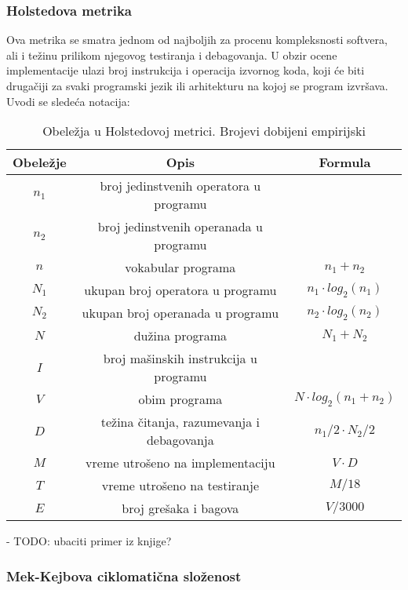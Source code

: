 \documentclass[a4paper]{article}
\begin{document}
\subsubsection{Holstedova metrika}
\label{subsec:holsted}

Ova metrika se smatra jednom od najboljih za procenu kompleksnosti softvera, ali i težinu prilikom njegovog testiranja i debagovanja. U obzir ocene implementacije ulazi broj instrukcija i operacija izvornog koda, koji će biti drugačiji za svaki programski jezik ili arhitekturu na kojoj se program izvršava. Uvodi se sledeća notacija:\\
\begin{center}
 \begin{table}[h]
 \begin{tabular}{|c|c|c|}
 \hline
 Obeležje & Opis & Formula \\ [0ex] 
 \hline
 $n_1$ & broj jedinstvenih operatora u programu & \\ 
 \hline
 $n_2$ & broj jedinstvenih operanada u programu & \\ 
 \hline
 $n$ & vokabular programa & $ n_1 + n_2 $ \\ 
 \hline
 $N_1$ & ukupan broj operatora u programu & $ n_1 \cdot log_2(n_1) $ \\ 
 \hline
 $N_2$ & ukupan broj operanada u programu & $ n_2 \cdot log_2(n_2) $ \\ 
 \hline
 $N$ & dužina programa & $ N_1 + N_2 $ \\
 \hline
 $I$ & broj mašinskih instrukcija u programu & \\
 \hline
 $V$ & obim programa & $ N \cdot log_2(n_1+n_2) $ \\
 \hline
 $D$ & težina čitanja, razumevanja i debagovanja & $ n_1/2 \cdot N_2 / 2  $ \\
 \hline
 $M$ & vreme utrošeno na implementaciju & $ V \cdot D $ \\
 \hline
 $T$ & vreme utrošeno na testiranje & $ M / 18 $ \\
 \hline
 $E$ & broj grešaka i bagova & $ V / 3000 $ \\
 \hline
\end{tabular}
 \caption{Obeležja u Holstedovoj metrici. Brojevi dobijeni empirijski \cite{ibm_halstead}}
 \label{tabela:1}
\end{table}
\end{center}

- TODO:  ubaciti primer iz knjige? 

\subsubsection{Mek-Kejbova ciklomatična složenost}
\label{subsec:mekkejb}
\end{document}
